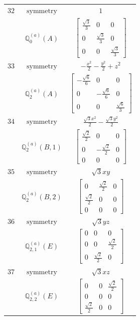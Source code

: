 \documentclass[fleqn,8pt,landscape]{jsarticle}
\begin{document}
\begin{longtable}{ccc}
$ 32 $ & $ \text{symmetry} $ & $ 1 $ \\
$  $ & $ \mathbb{Q}_{0}^{(a)}(A) $ & $ \begin{bmatrix} \frac{\sqrt{3}}{3} & 0 & 0 \\ 0 & \frac{\sqrt{3}}{3} & 0 \\ 0 & 0 & \frac{\sqrt{3}}{3} \end{bmatrix} $ \\ \hline
$ 33 $ & $ \text{symmetry} $ & $ - \frac{x^{2}}{2} - \frac{y^{2}}{2} + z^{2} $ \\
$  $ & $ \mathbb{Q}_{2}^{(a)}(A) $ & $ \begin{bmatrix} - \frac{\sqrt{6}}{6} & 0 & 0 \\ 0 & - \frac{\sqrt{6}}{6} & 0 \\ 0 & 0 & \frac{\sqrt{6}}{3} \end{bmatrix} $ \\ \hline
$ 34 $ & $ \text{symmetry} $ & $ \frac{\sqrt{3} x^{2}}{2} - \frac{\sqrt{3} y^{2}}{2} $ \\
$  $ & $ \mathbb{Q}_{2}^{(a)}(B,1) $ & $ \begin{bmatrix} \frac{\sqrt{2}}{2} & 0 & 0 \\ 0 & - \frac{\sqrt{2}}{2} & 0 \\ 0 & 0 & 0 \end{bmatrix} $ \\ \hline
$ 35 $ & $ \text{symmetry} $ & $ \sqrt{3} x y $ \\
$  $ & $ \mathbb{Q}_{2}^{(a)}(B,2) $ & $ \begin{bmatrix} 0 & \frac{\sqrt{2}}{2} & 0 \\ \frac{\sqrt{2}}{2} & 0 & 0 \\ 0 & 0 & 0 \end{bmatrix} $ \\ \hline
$ 36 $ & $ \text{symmetry} $ & $ \sqrt{3} y z $ \\
$  $ & $ \mathbb{Q}_{2,1}^{(a)}(E) $ & $ \begin{bmatrix} 0 & 0 & 0 \\ 0 & 0 & \frac{\sqrt{2}}{2} \\ 0 & \frac{\sqrt{2}}{2} & 0 \end{bmatrix} $ \\ \hline
$ 37 $ & $ \text{symmetry} $ & $ \sqrt{3} x z $ \\
$  $ & $ \mathbb{Q}_{2,2}^{(a)}(E) $ & $ \begin{bmatrix} 0 & 0 & \frac{\sqrt{2}}{2} \\ 0 & 0 & 0 \\ \frac{\sqrt{2}}{2} & 0 & 0 \end{bmatrix} $ \\ \hline

\end{longtable}
\end{document}
